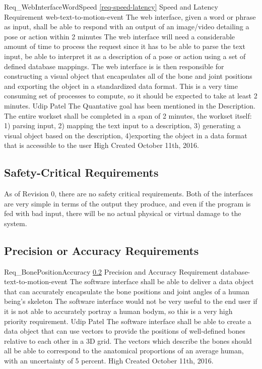 \documentclass{scrreprt}
\begin{document}
\requirement
{Req_WebInterfaceWordSpeed}
{\ref{req-speed-latency} Speed and Latency Requirement}
{web-text-to-motion-event}
{The web interface, given a word or phrase as input, shall be able to respond with an output of an image/video detailing a pose or action within 2 minutes}
{The web interface will need a considerable amount of time to process the request since it has to be able to parse the text input, be able to interpret it as a description of a pose or action using a set of defined database mappings. The web interface is is then responsible for constructing a visual object that encapsulates all of the bone and joint positions and exporting the object in a standardized data format. This is a very time consuming set of processes to compute, so it should be expected to take at least 2 minutes.}
{Udip Patel}
{The Quantative goal has been mentioned in the Description. The entire workset shall be completed in a span of 2 minutes, the workset itself: 1) parsing input, 2) mapping the text input to a description, 3) generating a visual object based on the description, 4)exporting the object in a data format that is accessible to the user }
{High}
{Created October 11th, 2016.}

\subsection{Safety-Critical Requirements}
\label{req-safety-critical}
As of Revision 0, there are no safety critical requirements. Both of the interfaces are very simple in terms of the output they produce, and even if the program is fed with bad input, there will be no actual physical or virtual damage to the system.

\subsection{Precision or Accuracy Requirements}
\label{req-precision-accuracy}
\requirement
{Req_BonePositionAccuracy}
{\ref{req-precision-accuracy} Precision and Accuracy Requirement}
{database-text-to-motion-event}
{The software interface shall be able to deliver a data object that can accurately encapsulate the bone positions and joint angles of a human being's skeleton}
{The software interface would not be very useful to the end user if it is not able to accurately portray a human bodym, so this is a very high priority requirement.}
{Udip Patel}
{The software interface shall be able to create a data object that can use vectors to provide the positions of well-defined bones relative to each other in a 3D grid. The vectors which describe the bones should all be able to correspond to the anatomical proportions of an average human, with an uncertainty of 5 percent.}
{High}
{Created October 11th, 2016.}
\end{document}
